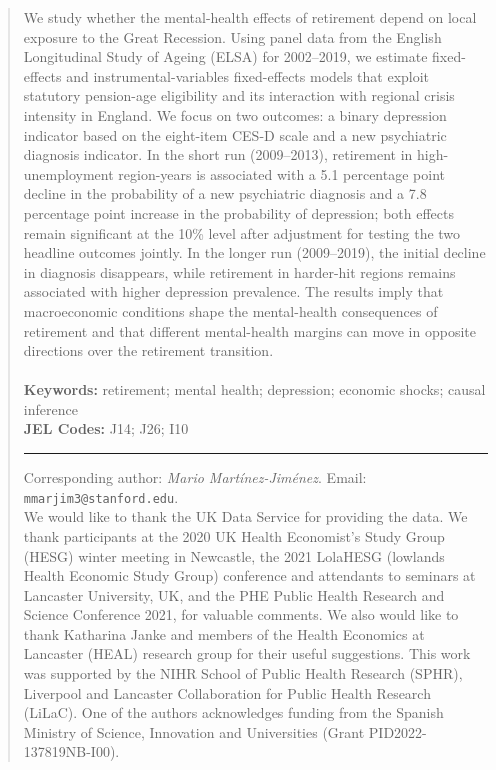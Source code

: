 \documentclass[arguments, manuscript, 11pt]{aastex631}
\newcommand{\firstpageruleack}[1]{%
  \par\vspace*{\fill}%
\noindent\hspace*{2em}\rule{0.8\linewidth}{0.4pt}
  \par\vspace{0.4em}%
  {\scriptsize #1\par}%
  \thispagestyle{empty}%
  \clearpage
}
\begin{document}
\begin{abstract}
\linespread{0.85} 

\noindent\begin{minipage}{0.85\textwidth}
\vspace{0.5cm}
\footnotesize{We study whether the mental-health effects of retirement depend on local exposure to the Great Recession. Using panel data from the English Longitudinal Study of Ageing (ELSA) for 2002--2019, we estimate fixed-effects and instrumental-variables fixed-effects models that exploit statutory pension-age eligibility and its interaction with regional crisis intensity in England. We focus on two outcomes: a binary depression indicator based on the eight-item CES-D scale and a new psychiatric diagnosis indicator. In the short run (2009--2013), retirement in high-unemployment region-years is associated with a 5.1 percentage point decline in the probability of a new psychiatric diagnosis and a 7.8 percentage point increase in the probability of depression; both effects remain significant at the 10\% level after adjustment for testing the two headline outcomes jointly. In the longer run (2009--2019), the initial decline in diagnosis disappears, while retirement in harder-hit regions remains associated with higher depression prevalence. The results imply that macroeconomic conditions shape the mental-health consequences of retirement and that different mental-health margins can move in opposite directions over the retirement transition.}\\
\vspace{-0.25cm}\\
\noindent\textbf{Keywords:} retirement; mental health; depression; economic shocks; causal inference\\
\noindent\textbf{JEL Codes:} J14; J26; I10\\
\end{minipage}

\firstpageruleack{
Corresponding author: \emph{Mario Martínez-Jiménez}. Email: \texttt{mmarjim3@stanford.edu}.\\
We would like to thank the UK Data Service for providing the data. We thank participants at the 2020 UK Health Economist's Study Group (HESG) winter meeting in Newcastle, the 2021 LolaHESG (lowlands Health Economic Study Group) conference and attendants to seminars at Lancaster University, UK, and the PHE Public Health Research and Science Conference 2021, for valuable comments. We also would like to thank Katharina Janke and members of the Health Economics at Lancaster (HEAL) research group for their useful suggestions. This work was supported by the NIHR School of Public Health Research (SPHR), Liverpool and Lancaster Collaboration for Public Health Research (LiLaC). One of the authors acknowledges funding from the Spanish Ministry of Science, Innovation and Universities (Grant PID2022-137819NB-I00).
}
\end{abstract}
\end{document}
